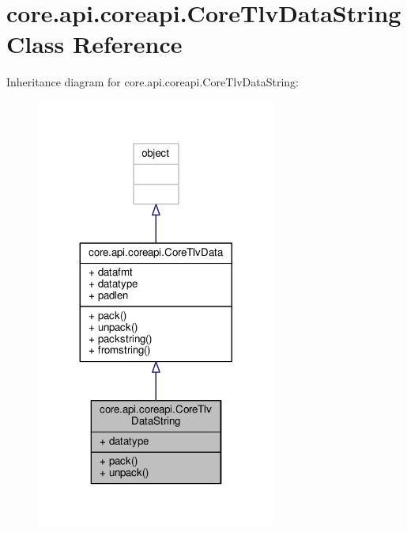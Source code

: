\hypertarget{classcore_1_1api_1_1coreapi_1_1_core_tlv_data_string}{\section{core.\+api.\+coreapi.\+Core\+Tlv\+Data\+String Class Reference}
\label{classcore_1_1api_1_1coreapi_1_1_core_tlv_data_string}
}


Inheritance diagram for core.\+api.\+coreapi.\+Core\+Tlv\+Data\+String\+:
\nopagebreak
\begin{figure}[H]
\begin{center}
\leavevmode
\includegraphics[width=224pt]{classcore_1_1api_1_1coreapi_1_1_core_tlv_data_string__inherit__graph}
\end{center}
\end{figure}


